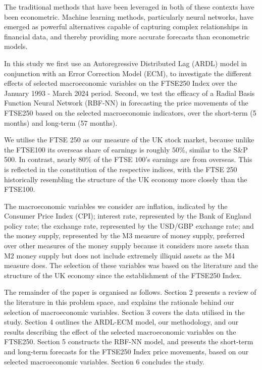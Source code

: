 \documentclass[11pt,a4paper]{article}
\begin{document}
The traditional methods that have been leveraged in both of these contexts have been econometric.
Machine learning methods, particularly neural networks, have emerged as powerful alternatives capable
of capturing complex relationships in financial data, and thereby providing more
accurate forecasts than econometric models.

In this study we first use an Autoregressive Distributed Lag (ARDL) model in conjunction with an Error Correction Model (ECM), to investigate 
the different effects of selected macroeconomic variables on the FTSE250 Index over the January 1993 - March 2024 period.
Second, we test the efficacy of a Radial Basis Function Neural Network (RBF-NN) in forecasting the price movements of the FTSE250 based on the selected macroeconomic indicators, over the short-term 
(5 months) and long-term (57 months). 


We utilise the FTSE 250 as our measure of the UK stock market, because unlike the 
FTSE100 its overseas share of earnings is 
roughly $50\%$, similar to the S\&P 500. In contrast, nearly $80\%$ of the FTSE $100$'s earnings 
are from overseas. This is reflected in the constitution of the respective indices, with 
the FTSE 250 historically resembling the structure 
of the UK economy more closely than the FTSE100.

The macroeconomic variables we consider are inflation, indicated by the Consumer Price
Index (CPI); interest rate, represented by the Bank of England policy rate; the exchange rate, 
represented by the USD/GBP exchange rate; and the money supply, represented by the 
M3 measure of money supply, preferred over other 
measures of the money supply because it considers more assets than M2 money supply 
but does not include extremely illiquid assets as the M4 measure does. The selection 
of these variables was based on the literature and the structure of the UK economy since 
the establishment of the FTSE250 Index.

The remainder of the paper is organised as follows. 
Section 2 presents a review of the literature in this problem space, and explains the rationale behind our selection of macroeconomic variables.
Section 3 covers the data utilised in the study. Section 4 outlines the ARDL-ECM model, our methodology, and our results describing
the effect of the selected macroeconomic variables on the FTSE250. Section 5 constructs the RBF-NN model, and presents the short-term and long-term
forecasts for the FTSE250 Index price movements, based on our selected macroeconomic variables. Section 6 concludes the study.
\end{document}
